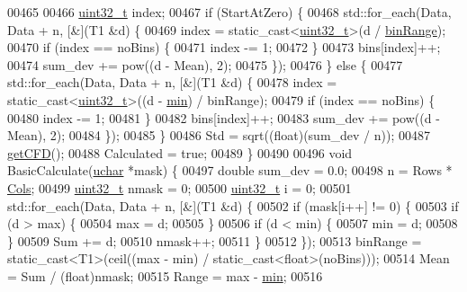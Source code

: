 \begin{DoxyCode}
00465 
00466     \hyperlink{_soil_math_types_8h_a435d1572bf3f880d55459d9805097f62}{uint32\_t} index;
00467     \textcolor{keywordflow}{if} (StartAtZero) \{
00468       std::for\_each(Data, Data + n, [&](T1 &d) \{
00469         index = \textcolor{keyword}{static\_cast<}\hyperlink{_soil_math_types_8h_a435d1572bf3f880d55459d9805097f62}{uint32\_t}\textcolor{keyword}{>}(d / \hyperlink{class_soil_math_1_1_stats_a00be1d2a705a8aba532fbe726001bbb2}{binRange});
00470         \textcolor{keywordflow}{if} (index == noBins) \{
00471           index -= 1;
00472         \}
00473         bins[index]++;
00474         sum\_dev += pow((d - Mean), 2);
00475       \});
00476     \} \textcolor{keywordflow}{else} \{
00477       std::for\_each(Data, Data + n, [&](T1 &d) \{
00478         index = \textcolor{keyword}{static\_cast<}\hyperlink{_soil_math_types_8h_a435d1572bf3f880d55459d9805097f62}{uint32\_t}\textcolor{keyword}{>}((d - \hyperlink{class_soil_math_1_1_stats_aa44c07a23b1c2ce0f0407e7cee4f39a9}{min}) / binRange);
00479         \textcolor{keywordflow}{if} (index == noBins) \{
00480           index -= 1;
00481         \}
00482         bins[index]++;
00483         sum\_dev += pow((d - Mean), 2);
00484       \});
00485     \}
00486     Std = sqrt((\textcolor{keywordtype}{float})(sum\_dev / n));
00487     \hyperlink{class_soil_math_1_1_stats_a5508190fbea17bfec505ff8c47b1a45e}{getCFD}();
00488     Calculated = \textcolor{keyword}{true};
00489   \}
00490 
00496   \textcolor{keywordtype}{void} BasicCalculate(\hyperlink{_soil_math_types_8h_a65f85814a8290f9797005d3b28e7e5fc}{uchar} *mask) \{
00497     \textcolor{keywordtype}{double} sum\_dev = 0.0;
00498     n = Rows * \hyperlink{class_soil_math_1_1_stats_a971f1ec23c32137805c4577f05454d83}{Cols};
00499     \hyperlink{_soil_math_types_8h_a435d1572bf3f880d55459d9805097f62}{uint32\_t} nmask = 0;
00500     \hyperlink{_soil_math_types_8h_a435d1572bf3f880d55459d9805097f62}{uint32\_t} i = 0;
00501     std::for\_each(Data, Data + n, [&](T1 &d) \{
00502       \textcolor{keywordflow}{if} (mask[i++] != 0) \{
00503         \textcolor{keywordflow}{if} (d > max) \{
00504           max = d;
00505         \}
00506         \textcolor{keywordflow}{if} (d < min) \{
00507           min = d;
00508         \}
00509         Sum += d;
00510         nmask++;
00511       \}
00512     \});
00513     binRange = \textcolor{keyword}{static\_cast<}T1\textcolor{keyword}{>}(ceil((max - min) / static\_cast<float>(noBins)));
00514     Mean = Sum / (float)nmask;
00515     Range = max - \hyperlink{class_soil_math_1_1_stats_aa44c07a23b1c2ce0f0407e7cee4f39a9}{min};
00516 

\end{DoxyCode}
